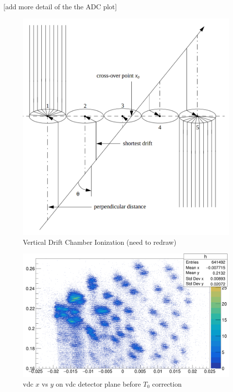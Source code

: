 [add more detail of the the ADC plot]

\begin{figure}
    \centering
    \includegraphics[scale = 0.25]{images/chap4/vdc_wire_ionize.png}
    \caption{Vertical Drift Chamber Ionization (need to redraw)}
    \label{fig:vdc_wire_ionization_cluster}
\end{figure}

\begin{figure}
    \centering
    \includegraphics[width=\textwidth]{images/chap4/vdc_t0_before_correction.png}
    \caption{vdc $x$ vs $y$ on vdc detector plane before $T_0$ correction}
    \label{fig:vdc_t0_before_correction}
\end{figure}


